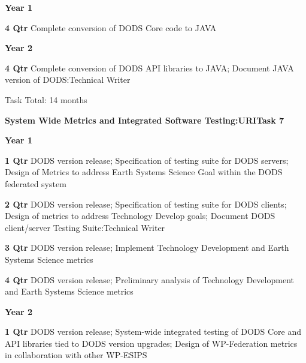 \documentclass[12pt]{article}
\begin{document}
\begin{description}
 \item{\large \bf Year 1}
   \begin{description}

   \item{\bf 4 Qtr} Complete conversion of DODS Core code to JAVA

   \end{description}
 \item{\large \bf Year 2}
   \begin{description}

   \item{\bf 4 Qtr} Complete conversion of DODS API libraries to JAVA;
     Document JAVA version of DODS:Technical Writer

 Task Total: 14 months

   \end{description}
\begin{center}
{\large \bf System Wide Metrics and Integrated Software Testing:URITask 7}
\end{center}

 \item{\large \bf Year 1}
   \begin{description}

   \item{\bf 1 Qtr} DODS version release; Specification of testing suite for
     DODS servers; Design of Metrics to address Earth Systems Science Goal
     within the DODS federated system

   \item{\bf 2 Qtr} DODS version release; Specification of testing suite for
     DODS clients; Design of metrics to address Technology Develop goals;
     Document DODS client/server Testing Suite:Technical Writer

   \item{\bf 3 Qtr} DODS version release; Implement Technology Development
     and Earth Systems Science metrics

   \item{\bf 4 Qtr} DODS version release; Preliminary analysis
     of Technology Development and Earth Systems Science metrics

   \end{description}
 \item{\large \bf Year 2}
   \begin{description}

   \item{\bf 1 Qtr} DODS version release; System-wide integrated testing of
     DODS Core and API libraries tied to DODS version upgrades; Design of
     WP-Federation metrics in collaboration with other WP-ESIPS


\end{description}
\end{description}
\end{document}
